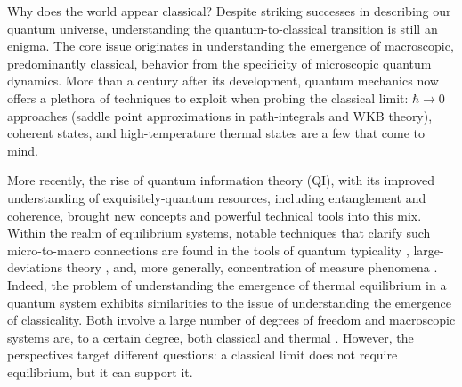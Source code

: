 \documentclass[a4paper,11pt,accepted=2024-09-14]{quantumarticle}
\newcommand{\+}         {\dagger}
\begin{document}
	

\maketitle

Why does the world appear classical? Despite striking successes in describing our quantum universe, understanding the quantum-to-classical transition is still an enigma. The core issue originates in understanding the emergence of macroscopic, predominantly classical, behavior from the specificity of microscopic quantum dynamics. More than a century after its development, quantum mechanics now offers a plethora of techniques to exploit when probing the classical limit: $\hbar \to 0$ approaches (saddle point approximations in path-integrals and WKB theory), coherent states, and high-temperature thermal states are a few that come to mind.

More recently, the rise of quantum information theory (QI), with its improved understanding of exquisitely-quantum resources, including entanglement and coherence, brought new concepts and powerful technical tools into this mix. Within the realm of equilibrium systems, notable techniques that clarify such micro-to-macro connections are found in the tools of quantum typicality \cite{Gemmer,Popescu,Deffner2015NP}, large-deviations theory \cite{Touchette}, and, more generally, concentration of measure phenomena \cite{Ledoux}. Indeed, the problem of understanding the emergence of thermal equilibrium in a quantum system exhibits similarities to the issue of understanding the emergence of classicality. Both involve a large number of degrees of freedom and macroscopic systems are, to a certain degree, both classical and thermal \cite{Le}. However, the perspectives target different questions: a classical limit does not require  equilibrium, but it can support it. 
\end{document}
